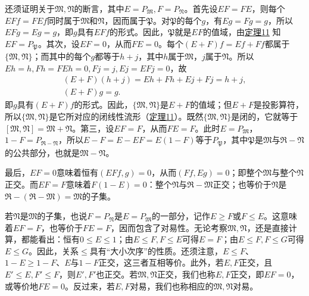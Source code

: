 \documentclass[fontsize=13pt,twoside,openany,headings=normal,parskip=false,bookmarkpackage=false,DIV=calc]{scrbook}
\begin{document}
\hypertarget{origpage-44}{}\label{origpage-44}还须证明关于$\mathfrak{M},\allowbreak \mathfrak{N}$的断言，其中$E=P_{\mathfrak{M}},\allowbreak F=P_{\mathfrak{N}}$。首先设$EF=FE$，则每个$EFf=FEf$同时属于$\mathfrak{M}$和$\mathfrak{N}$，因而属于$\mathfrak{P}$。对$\mathfrak{P}$的每个$g$，有$Eg=Fg=g$，所以$EFg=Eg=g$，即$g$具有$EFf$的形式。因此，$\mathfrak{P}$就是$EF$的值域，由\CJKglue \hyperref[thm:II.11]{定理11} 知$EF=P_{\mathfrak{P}}$。其次，设$EF=0$，从而$FE=0$。每个$(E+F)f=Ef+Ff$都属于$\{\mathfrak{M},\allowbreak \mathfrak{N}\}$；而其中的每个$g$都等于$h+j$，其中$h$属于$\mathfrak{M}$，$j$属于$\mathfrak{N}$。所以$Eh=h,\allowbreak Fh=FEh=0,\allowbreak Fj=j,\allowbreak Ej=EFj=0$，故
\begin{gather*}
(E+F)(h+j)=Eh+Fh+Ej+Fj=h+j,\\
(E+F)g=g.
\end{gather*}
即$g$具有$(E+F)f$的形式。因此，$\{\mathfrak{M},\allowbreak \mathfrak{N}\}$是$E+F$的值域；但$E+F$是投影算符，所以$\{\mathfrak{M},\allowbreak \mathfrak{N}\}$是它所对应的闭线性流形（\hyperref[thm:II.11]{定理11}）。既然$\{\mathfrak{M},\allowbreak \mathfrak{N}\}$是闭的，它就等于$[\mathfrak{M},\allowbreak \mathfrak{N}]=\mathfrak{M}+\mathfrak{N}$。第三，设$EF=F$，从而$FE=F$。此时$E=P_{\mathfrak{M}}$，$1-F=P_{\mathfrak{R}-\mathfrak{N}}$，所以$E-F=E-EF=E(1-F)$等于$P_{\mathfrak{P}}$，其中$\mathfrak{P}$是$\mathfrak{M}$与$\mathfrak{R}-\mathfrak{N}$的公共部分，也就是$\mathfrak{M}-\mathfrak{N}$。

最后，$EF=0$意味着恒有$(EFf,\allowbreak g)=0$，从而$(Ff,\allowbreak Eg)=0$；即整个$\mathfrak{M}$与整个$\mathfrak{N}$正交。而$EF=F$意味着$F(1-E)=0$：整个$\mathfrak{N}$与$\mathfrak{R}-\mathfrak{M}$正交；也等价于$\mathfrak{N}$是$\mathfrak{R}-(\mathfrak{R}-\mathfrak{M})=\mathfrak{M}$的子集。

若$\mathfrak{N}$是$\mathfrak{M}$的子集，也说$F=P_{\mathfrak{N}}$是$E=P_{\mathfrak{M}}$的一部分，记作$E\geq F$或$F\leq E$。这意味着$EF=F$，也等价于$FE=F$，因而包含了对易性。无论考察$\mathfrak{M},\allowbreak \mathfrak{N}$，还是直接计算，都能看出：恒有$0\leq E\leq1$；由$E\leq F,\allowbreak F\leq E$可得$E=F$；由$E\leq F,\allowbreak F\leq G$可得$E\leq G$。因此，关系$\leq$具有“大小次序”的性质。还须注意，$E\leq F$、$1-E\geq1-F$、$E$与$1-F$正交，这三者互相等价。此外，若$E,\allowbreak F$正交，且$E'\leq E,\allowbreak F'\leq F$，则$E',\allowbreak F'$也正交。若$\mathfrak{M},\allowbreak \mathfrak{N}$正交，我们也称$E,\allowbreak F$正交，即$EF=0$，或等价地$FE=0$。反过来，若$E,\allowbreak F$对易，我们也称相应的$\mathfrak{M},\allowbreak \mathfrak{N}$对易。
\end{document}
